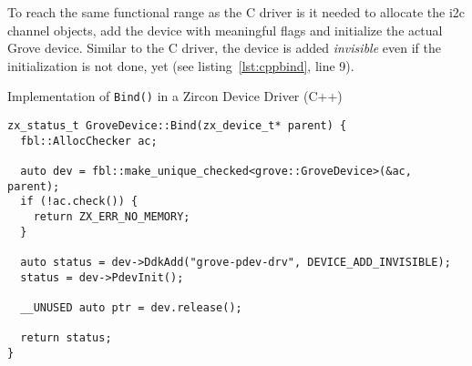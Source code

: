 To reach the same functional range as the C driver is it needed to allocate the \ac{i2c} channel objects, add the device with meaningful flags and initialize the actual Grove device.
Similar to the C driver, the device is added \textit{invisible} even if the initialization is not done, yet (see listing~\ref{lst:cppbind}, line 9).
%
\begin{listing} [H]
    \caption{Implementation of \texttt{Bind()} in a Zircon Device Driver (C++)}
\label{lst:cppbind}
\begin{verbatim}
zx_status_t GroveDevice::Bind(zx_device_t* parent) {
  fbl::AllocChecker ac;

  auto dev = fbl::make_unique_checked<grove::GroveDevice>(&ac, parent);
  if (!ac.check()) {
    return ZX_ERR_NO_MEMORY;
  }

  auto status = dev->DdkAdd("grove-pdev-drv", DEVICE_ADD_INVISIBLE);
  status = dev->PdevInit();

  __UNUSED auto ptr = dev.release();

  return status;
}
\end{verbatim}
\end{listing}
%
%
